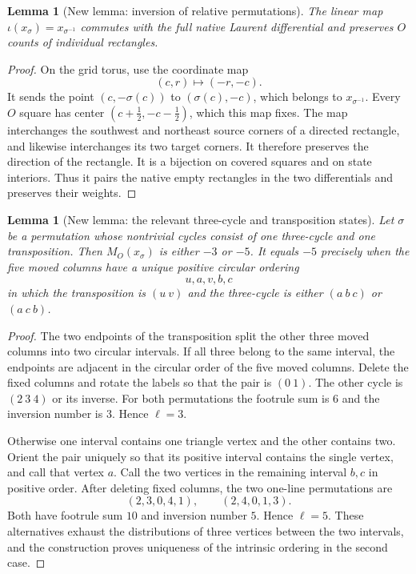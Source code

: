 \documentclass[11pt,oneside]{report}
\newtheorem{lemma}[theorem]{Lemma}
\theoremstyle{definition}
\numberwithin{equation}{section}
\begin{document}
\begin{lemma}[New lemma: inversion of relative permutations]
\label{J21:lem:torus-inverse-commutes}
The linear map $\iota(x_\sigma)=x_{\sigma^{-1}}$ commutes with the
full native Laurent differential and preserves $O$ counts of individual
rectangles.
\end{lemma}
\begin{proof}
On the grid torus, use the coordinate map
\[
 (c,r)\longmapsto(-r,-c).
\]
It sends the point $(c,-\sigma(c))$ to $(\sigma(c),-c)$, which belongs
to $x_{\sigma^{-1}}$. Every $O$ square has center
$(c+\tfrac12,-c-\tfrac12)$, which this map fixes.
The map interchanges the southwest and northeast source corners of
a directed rectangle, and likewise interchanges its two target corners.
It therefore preserves the direction of the rectangle. It is a bijection
on covered squares and on state interiors. Thus it pairs the native
empty rectangles in the two differentials and preserves their weights.
\end{proof}

\begin{lemma}[New lemma: the relevant three-cycle and transposition states]
\label{J21:lem:torus-three-two-type}
Let $\sigma$ be a permutation whose nontrivial cycles consist of one
three-cycle and one transposition. Then $M_O(x_\sigma)$ is either $-3$
or $-5$. It equals $-5$ precisely when the five moved columns have a
unique positive circular ordering
\[
 u,a,v,b,c
\]
in which the transposition is $(u\ v)$ and the three-cycle is either
$(a\ b\ c)$ or $(a\ c\ b)$.
\end{lemma}
\begin{proof}
The two endpoints of the transposition split the other three moved
columns into two circular intervals. If all three belong to the same
interval, the endpoints are adjacent in the circular order of the five
moved columns. Delete the fixed columns and rotate the labels so that
the pair is $(0\ 1)$. The other cycle is $(2\ 3\ 4)$ or its inverse.
For both permutations the footrule sum is $6$ and the inversion number
is $3$. Hence $\ell=3$.

Otherwise one interval contains one triangle vertex and the other
contains two. Orient the pair uniquely so that its positive interval
contains the single vertex, and call that vertex $a$. Call the two
vertices in the remaining interval $b,c$ in positive order. After
deleting fixed columns, the two one-line permutations are
\[
 (2,3,0,4,1),\qquad(2,4,0,1,3).
\]
Both have footrule sum $10$ and inversion number $5$. Hence $\ell=5$.
These alternatives exhaust the distributions of three vertices between
the two intervals, and the construction proves uniqueness of the
intrinsic ordering in the second case.
\end{proof}
\end{document}
